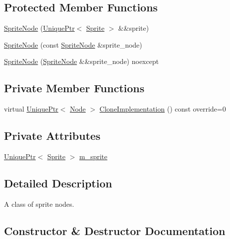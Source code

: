 \subsection*{Protected Member Functions}
\begin{DoxyCompactItemize}
\item 
\hyperlink{classmage_1_1_sprite_node_a6c1cbe186a3537ab5725ad53d6f8deb3}{Sprite\+Node} (\hyperlink{namespacemage_a3316d7143a973e37adf1110f2e80ca31}{Unique\+Ptr}$<$ \hyperlink{classmage_1_1_sprite}{Sprite} $>$ \&\&sprite)
\item 
\hyperlink{classmage_1_1_sprite_node_a5744942fd29d59c34820d9bb3bdd17b7}{Sprite\+Node} (const \hyperlink{classmage_1_1_sprite_node}{Sprite\+Node} \&sprite\+\_\+node)
\item 
\hyperlink{classmage_1_1_sprite_node_a00b1a1e71603a653cad5fe4f42c7547f}{Sprite\+Node} (\hyperlink{classmage_1_1_sprite_node}{Sprite\+Node} \&\&sprite\+\_\+node) noexcept
\end{DoxyCompactItemize}
\subsection*{Private Member Functions}
\begin{DoxyCompactItemize}
\item 
virtual \hyperlink{namespacemage_a3316d7143a973e37adf1110f2e80ca31}{Unique\+Ptr}$<$ \hyperlink{classmage_1_1_node}{Node} $>$ \hyperlink{classmage_1_1_sprite_node_a83a2a865b38670d64491a1066895e218}{Clone\+Implementation} () const override=0
\end{DoxyCompactItemize}
\subsection*{Private Attributes}
\begin{DoxyCompactItemize}
\item 
\hyperlink{namespacemage_a3316d7143a973e37adf1110f2e80ca31}{Unique\+Ptr}$<$ \hyperlink{classmage_1_1_sprite}{Sprite} $>$ \hyperlink{classmage_1_1_sprite_node_a5a330abe0fe7aca40bb4ef201e1c175c}{m\+\_\+sprite}
\end{DoxyCompactItemize}


\subsection{Detailed Description}
A class of sprite nodes. 

\subsection{Constructor \& Destructor Documentation}
\hypertarget{classmage_1_1_sprite_node_a04ada795f035b935af9992a6b7a75959}{}\label{classmage_1_1_sprite_node_a04ada795f035b935af9992a6b7a75959} 

